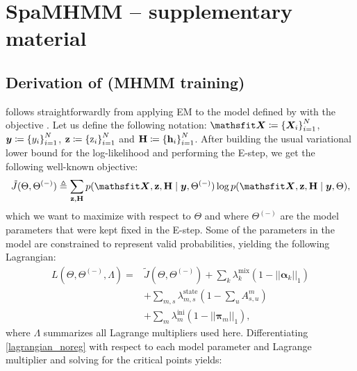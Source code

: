 
\chapter{SpaMHMM -- supplementary material} %

\label{appendix:spamhmm} %

\section{Derivation of  (MHMM training)}
\label{sec:proof_em_noreg}
 follows straightforwardly from applying EM to the model defined by  with the objective . Let us define the following notation: $\tX \coloneqq \left\lbrace \mX_i \right\rbrace_{i=1}^N$, ${\bm{y}} \coloneqq \left\lbrace y_i \right\rbrace_{i=1}^N$, ${\mathbf{z}} \coloneqq \left\lbrace {\textnormal{z}}_i \right\rbrace_{i=1}^N$ and ${\mathbf{H}} \coloneqq \left\lbrace {\mathbf{h}}_i \right\rbrace_{i=1}^N$. After building the usual variational lower bound for the log-likelihood and performing the E-step, we get the following well-known objective:
\begin{equation}
\label{m_step_obj_noreg}
\tilde{J}(\Theta,\Theta^{(-)}) \triangleq \sum_{\rvz,\rmH} p(\tX,\rvz,\rmH \mid \vy,\Theta^{(-)}) \log p(\tX,\rvz,\rmH \mid \vy,\Theta),
\end{equation}
which we want to maximize with respect to $\Theta$ and where $\Theta^{(-)}$ are the model parameters that were kept fixed in the E-step. Some of the parameters in the model are constrained to represent valid probabilities, yielding the following Lagrangian:
\begin{align}
\label{lagrangian_noreg}
L(\Theta,\Theta^{(-)},\Lambda) = &\tilde{J}(\Theta,\Theta^{(-)}) + \sum_k \lambda_k^{\text{mix}}\left(1 - ||\boldsymbol{\alpha}_k||_{1}\right) \nonumber\\
&+ \sum_{m,s} \lambda_{m,s}^\text{state} \left(1 - \sum_u A^m_{s,u}\right) \nonumber\\
&+ \sum_m \lambda_m^{\text{ini}} \left(1 - ||\boldsymbol{\pi}_m||_{1}\right),
\end{align}
where $\Lambda$ summarizes all Lagrange multipliers used here. Differentiating \eqref{lagrangian_noreg} with respect to each model parameter and Lagrange multiplier and solving for the critical points yields:

